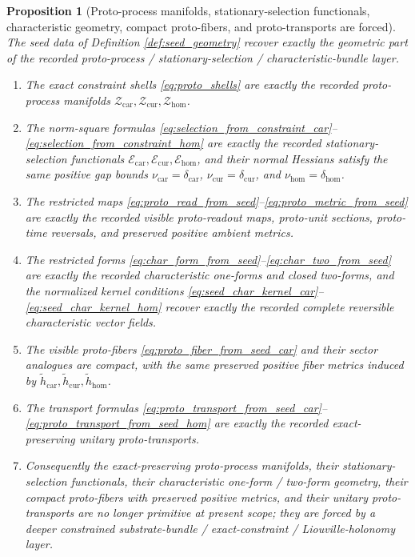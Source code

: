 \documentclass[11pt]{article}
\newcommand{\TensorProtoSpace}{\mathcal Z_{\mathrm{car}}}
\newcommand{\CurProtoSpace}{\mathcal Z_{\mathrm{cur}}}
\newcommand{\HomProtoSpace}{\mathcal Z_{\mathrm{hom}}}
\newcommand{\TensorProtoAmbientMetric}{\widetilde h_{\mathrm{car}}}
\newcommand{\CurProtoAmbientMetric}{\widetilde h_{\mathrm{cur}}}
\newcommand{\HomProtoAmbientMetric}{\widetilde h_{\mathrm{hom}}}
\newcommand{\TensorSelection}{\mathscr E_{\mathrm{car}}}
\newcommand{\CurSelection}{\mathscr E_{\mathrm{cur}}}
\newcommand{\HomSelection}{\mathscr E_{\mathrm{hom}}}
\newcommand{\TensorSelGap}{\nu_{\mathrm{car}}}
\newcommand{\CurSelGap}{\nu_{\mathrm{cur}}}
\newcommand{\HomSelGap}{\nu_{\mathrm{hom}}}
\newcommand{\TensorConstraintGap}{\delta_{\mathrm{car}}}
\newcommand{\CurConstraintGap}{\delta_{\mathrm{cur}}}
\newcommand{\HomConstraintGap}{\delta_{\mathrm{hom}}}
\newtheorem{proposition}{Proposition}
\begin{document}
\begin{proposition}[Proto-process manifolds, stationary-selection functionals, characteristic geometry, compact proto-fibers, and proto-transports are forced]
\label{prop:proto_geometry_forced}
The seed data of Definition \ref{def:seed_geometry} recover exactly the geometric part of the recorded proto-process / stationary-selection / characteristic-bundle layer.
\begin{enumerate}
    \item The exact constraint shells \eqref{eq:proto_shells} are exactly the recorded proto-process manifolds \(\TensorProtoSpace,\CurProtoSpace,\HomProtoSpace\).
    \item The norm-square formulas \eqref{eq:selection_from_constraint_car}--\eqref{eq:selection_from_constraint_hom} are exactly the recorded stationary-selection functionals \(\TensorSelection,\CurSelection,\HomSelection\), and their normal Hessians satisfy the same positive gap bounds \(\TensorSelGap=\TensorConstraintGap\), \(\CurSelGap=\CurConstraintGap\), and \(\HomSelGap=\HomConstraintGap\).
    \item The restricted maps \eqref{eq:proto_read_from_seed}--\eqref{eq:proto_metric_from_seed} are exactly the recorded visible proto-readout maps, proto-unit sections, proto-time reversals, and preserved positive ambient metrics.
    \item The restricted forms \eqref{eq:char_form_from_seed}--\eqref{eq:char_two_from_seed} are exactly the recorded characteristic one-forms and closed two-forms, and the normalized kernel conditions \eqref{eq:seed_char_kernel_car}--\eqref{eq:seed_char_kernel_hom} recover exactly the recorded complete reversible characteristic vector fields.
    \item The visible proto-fibers \eqref{eq:proto_fiber_from_seed_car} and their sector analogues are compact, with the same preserved positive fiber metrics induced by \(\TensorProtoAmbientMetric,\CurProtoAmbientMetric,\HomProtoAmbientMetric\).
    \item The transport formulas \eqref{eq:proto_transport_from_seed_car}--\eqref{eq:proto_transport_from_seed_hom} are exactly the recorded exact-preserving unitary proto-transports.
    \item Consequently the exact-preserving proto-process manifolds, their stationary-selection functionals, their characteristic one-form / two-form geometry, their compact proto-fibers with preserved positive metrics, and their unitary proto-transports are no longer primitive at present scope; they are forced by a deeper constrained substrate-bundle / exact-constraint / Liouville-holonomy layer.
\end{enumerate}
\end{proposition}
\end{document}
